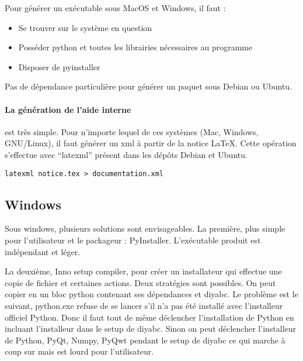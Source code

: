 \documentclass[12pt,a4paper]{article}
\begin{document}
    Pour générer un exécutable sous MacOS et Windows, il faut : 
    \begin{itemize}
    \item Se trouver sur le système en question
    \item Posséder python et toutes les librairies nécessaires au programme
    \item Disposer de pyinstaller\\
    \end{itemize}

    Pas de dépendance particulière pour générer un paquet sous Debian ou
    Ubuntu.\\

    \paragraph{La génération de l'aide interne} est très simple.
    \label{howtoLatexml}
    Pour n'importe lequel de ces systèmes (Mac, Windows, GNU/Linux), il faut
    générer un xml à partir de la notice \LaTeX . Cette opération s'effectue
    avec ``latexml'' présent dans les dépôts Debian et Ubuntu. \\
    \begin{verbatim}latexml notice.tex > documentation.xml\end{verbatim}

    
    \subsection{Windows}
        Sous windows, plusieurs solutions sont envisageables. La première, plus
        simple pour l'utilisateur et le packageur : PyInstaller. L'ex\'ecutable
        produit est ind\'ependant et l\'eger. \newline

        La deuxième, Inno setup compiler, pour cr\'eer un installateur qui
        effectue une copie de fichier et certaines actions.  Deux strat\'egies
        sont possibles. On peut copier en un bloc python contenant ses
        d\'ependances et diyabc. Le problème est le suivant, python.exe refuse
        de se lancer s'il n'a pas \'et\'e install\'e avec l'installeur officiel
        Python. Donc il faut tout de même d\'eclencher l'installation de Python
        en incluant l'installeur dans le setup de diyabc. Sinon on peut
        d\'eclencher l'installeur de Python, PyQt, Numpy, PyQwt pendant le setup
        de diyabc ce qui marche à coup sur mais est lourd pour
        l'utilisateur.\newline
        
\end{document}
